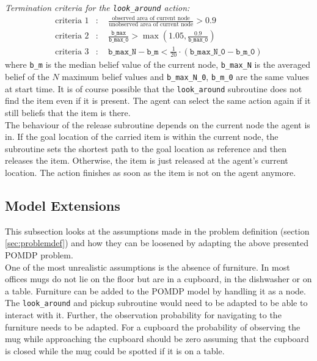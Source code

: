 \textit{Termination criteria for the \texttt{look\_around} action:}
\begin{align}
    \text{criteria 1}&: \quad \frac{\text{observed area of current node}}{\text{unobserved area of current node}} > 0.9\\
    \text{criteria 2}&: \quad \frac{\texttt{b\_max}}{\texttt{b\_max\_0}} > \max\left(1.05, \frac{0.9}{\texttt{b\_max\_0}}\right)\\
    \text{criteria 3}&: \quad  \texttt{b\_max\_N} - \texttt{b\_m} < \frac{1}{20}\cdot (\texttt{b\_max\_N\_0} - \texttt{b\_m\_0})
\end{align}
where \texttt{b\_m} is the median belief value of the current node, \texttt{b\_max\_N} is the averaged belief of the $N$ maximum belief values and \texttt{b\_max\_N\_0}, \texttt{b\_m\_0} are the same values at start time. It is of course possible that the \texttt{look\_around} subroutine does not find the item even if it is present. The agent can select the same action again if it still beliefs that the item is there.\\

The behaviour of the release subroutine depends on the current node the agent is in. If the goal location of the carried item is within the current node, the subroutine sets the shortest path to the goal location as reference and then releases the item. Otherwise, the item is just released at the agent's current location. The action finishes as soon as the item is not on the agent anymore.
\subsection{Model Extensions}\label{subsec:POMDP_extensions}
This subsection looks at the assumptions made in the problem definition (section \ref{sec:problemdef}) and how they can be loosened by adapting the above presented POMDP problem. \\

One of the most unrealistic assumptions is the absence of furniture. In most offices mugs do not lie on the floor but are in a cupboard, in the dishwasher or on a table. Furniture can be added to the POMDP model by handling it as a node. The \texttt{look\_around} and pickup subroutine would need to be adapted to be able to interact with it. Further, the observation probability for navigating to the furniture needs to be adapted. For a cupboard the probability of observing the mug while approaching the cupboard should be zero assuming that the cupboard is closed while the mug could be spotted if it is on a table.\\

